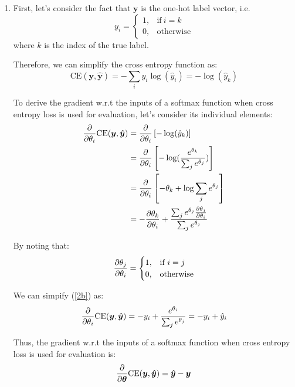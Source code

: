 \documentclass[10pt,reqno]{amsart}
\begin{document}
\begin{enumerate}[topsep=0pt,itemsep=3ex,partopsep=1ex,parsep=1ex]
\begin{enumerate}[itemsep=2ex]
  \item
    First, let's consider the fact that $\bm{y}$ is the one-hot label vector, i.e.
    \begin{equation*}
      y_i = 
      \begin{cases}
        1, & \text{if}\ i=k \\
        0, & \text{otherwise}
      \end{cases}
    \end{equation*}
    where $k$ is the index of the true label. 
    
    Therefore, we can simplify the cross entropy function as:
    \begin{equation*}
      \text{CE}(\bm{y}, \bm{\hat{y}})
        = - \sum_i y_i \log(\hat{y}_i)
        = - \log(\hat{y}_k)
    \end{equation*}

    To derive the gradient w.r.t the inputs of a softmax function when cross entropy loss
    is used for evaluation, let's consider its individual elements:
    \begin{align}
      \frac{\partial}{\partial \theta_i} \text{CE}(\bm{y}, \bm{\hat{y}})
      &= \frac{\partial}{\partial \theta_i} \left[ - \log(\hat{y}_k) \right] \nonumber \\
      &= \frac{\partial}{\partial \theta_i} \left[ - \log(\frac{e^{\theta_k}}{\sum_j e^{\theta_j}}) \right] \nonumber \\
      &= \frac{\partial}{\partial \theta_i} \left[ -\theta_k + \log \sum_j e^{\theta_j} \right] \nonumber \\
      &= - \frac{\partial \theta_k}{\partial \theta_i} + \frac{\sum_j e^{\theta_j} \frac{\partial \theta_j}{\partial \theta_i}}{\sum_j e^{\theta_j}} \label{2b}
    \end{align}

    By noting that:
    \begin{equation*}
      \frac{\partial \theta_j}{\partial \theta_i} = 
      \begin{cases}
        1, & \text{if}\ i=j \\
        0, & \text{otherwise}
      \end{cases}
    \end{equation*}

    We can simpify (\ref{2b}) as:
    \begin{equation*}
      \frac{\partial}{\partial \theta_i} \text{CE}(\bm{y}, \bm{\hat{y}})
      = - y_i + \frac{e^{\theta_i}}{\sum_j e^{\theta_j}} 
      = - y_i + \hat{y}_i 
    \end{equation*}

    Thus, the gradient w.r.t the inputs of a softmax function when cross entropy loss
    is used for evaluation is:
    \begin{equation*}
      \frac{\partial}{\partial \bm{\theta}} \text{CE}(\bm{y}, \bm{\hat{y}}) = \bm{\hat{y}} - \bm{y}
    \end{equation*}


\end{enumerate}
\end{enumerate}
\end{document}
